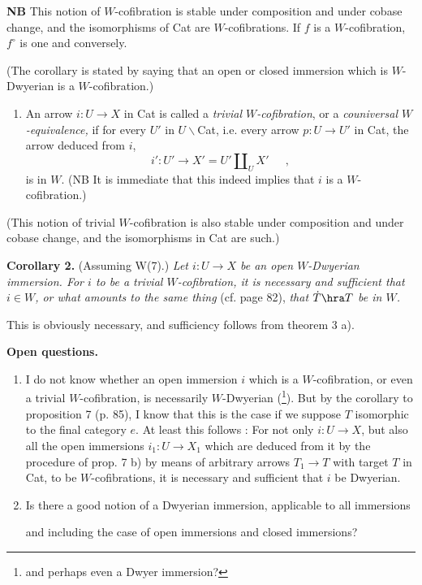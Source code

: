 \textbf{NB} This notion of $W$-cofibration is stable under composition and under cobase change, and the isomorphisms of Cat are $W$-cofibrations. If $f$ is a $W$-cofibration, $f^\circ$ is one and conversely.

(The corollary is stated by saying that an open or closed immersion which is $W$-Dwyerian is a $W$-cofibration.)

\begin{enumerate}[label=\alph*), start=4]
\item An arrow $i:U\longrightarrow X$ in Cat is called a \textit{trivial $W$-cofibration}, or a \textit{couniversal $W$-equivalence,} if for every $U'$ in $U\backslash$Cat, i.e. every arrow $p:U\longrightarrow U'$ in Cat, the arrow deduced from $i$,
\[ i':U'\longrightarrow X'=U'\amalg_U X'\quad\ \ , \]
is in $W$. (NB It is immediate that this indeed implies that $i$ is a $W$-cofibration.)
\end{enumerate}

(This notion of trivial $W$-cofibration is also stable under composition and under cobase change, and the isomorphisms in Cat are such.)


\textbf{Corollary 2.} (Assuming W(7).) \textit{Let $i:U\longrightarrow X$ be an open $W$-Dwyerian immersion. For $i$ to be a trivial $W$-cofibration, it is necessary and sufficient that $i\in W$, or what amounts to the same thing} (cf. page 82), \textit{that $\dot{T}\hra T$ be in $W$.}

This is obviously necessary, and sufficiency follows from theorem 3 a).

\textbf{Open questions.}

\begin{enumerate}[label=\alph*)]
\item I do not know whether an open immersion $i$ which is a $W$-cofibration, or even a trivial $W$-cofibration, is necessarily $W$-Dwyerian (\footnote{and perhaps even a Dwyer immersion?}). But by the corollary to proposition 7 (p. 85), I know that this is the case if we suppose $T$ isomorphic to the final category $e$. At least this follows : For not only $i:U\longrightarrow X$, but also all the open immersions $i_1:U\longrightarrow X_1$ which are deduced from it by the procedure of prop. 7 b) by means of arbitrary arrows $T_1\longrightarrow T$ with target $T$ in Cat, to be $W$-cofibrations, it is necessary and sufficient that $i$ be Dwyerian. %

\item {}
Is there a good notion of a Dwyerian immersion, applicable to all immersions


and including the case of open immersions and closed immersions?
\end{enumerate}

